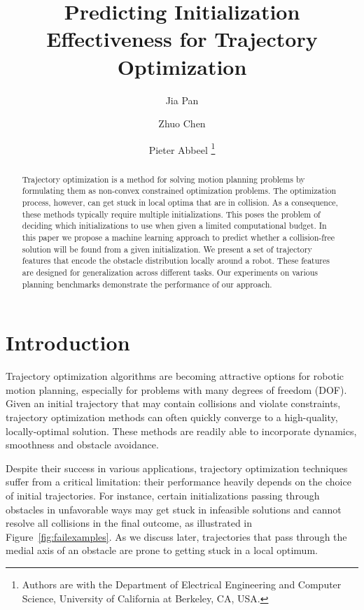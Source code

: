 \documentclass[letterpaper, 10 pt, conference]{ieeeconf}  %
\title{\LARGE \bf
  Predicting Initialization Effectiveness for Trajectory Optimization
}
\author{Jia Pan \and Zhuo Chen \and Pieter Abbeel \thanks{Authors are with the Department of Electrical Engineering and Computer Science, University of California at Berkeley, CA, USA.}}
\begin{document}
\maketitle
\thispagestyle{empty}
\pagestyle{empty}


\begin{abstract}
Trajectory optimization is a method for solving motion planning problems by formulating them as non-convex constrained optimization problems. The optimization process, however, can get stuck in local optima that are in collision. As a consequence, these methods typically require multiple initializations.  This poses the problem of deciding which initializations to use when given a limited computational budget. In this paper we propose a machine learning approach to predict whether a collision-free solution will be found from a given initialization. We present a set of trajectory features that encode the obstacle distribution locally around a robot. These features are designed for generalization across different tasks.  Our experiments on various planning benchmarks demonstrate the performance of our approach.
\end{abstract}


\section{Introduction}
Trajectory optimization algorithms are becoming attractive options for robotic motion planning, especially for problems with many degrees of freedom (DOF). Given an initial trajectory that may contain collisions and violate constraints, trajectory optimization methods can often quickly converge to a high-quality, locally-optimal solution. These methods are readily able to incorporate dynamics, smoothness and obstacle avoidance.

Despite their success in various applications, trajectory optimization techniques suffer from a critical limitation: their performance heavily depends on the choice of initial trajectories. For instance, certain initializations passing through obstacles in unfavorable ways may get stuck in infeasible solutions and cannot resolve all collisions in the final outcome, as illustrated in Figure~\ref{fig:failexamples}. As we discuss later, trajectories that pass through the medial axis of an obstacle are prone to getting stuck in a local optimum.
\end{document}
